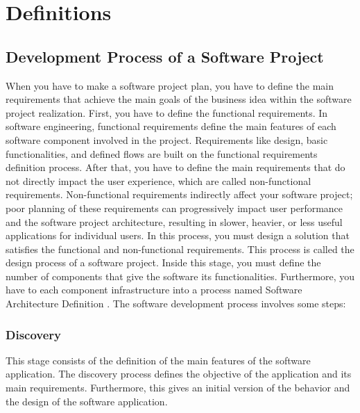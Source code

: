 
\chapter{Definitions}
\label{cha:definitions}

\section{Development Process of a Software Project}
When you have to make a software project plan, you have to define the main requirements that achieve the main goals of the business idea within the software project realization. First, you have to define the functional requirements. In software engineering, functional requirements define the main features of each software component involved in the project. Requirements like design, basic functionalities, and defined flows are built on the functional requirements definition process.
After that, you have to define the main requirements that do not directly impact the user experience, which are called non-functional requirements. Non-functional requirements indirectly affect your software project; poor planning of these requirements can progressively impact user performance and the software project architecture, resulting in slower, heavier, or less useful applications for individual users. In this process, you must design a solution that satisfies the functional and non-functional requirements. This process is called the design process of a software project. Inside this stage, you must define the number of components that give the software its functionalities. Furthermore, you have to each component infrastructure into a process named Software Architecture Definition \citet{software-engineering-book}.  The software development process involves some steps: 

\subsection{Discovery}
This stage consists of the definition of the main features of the software application. The discovery process defines the objective of the application and its main requirements. Furthermore, this gives an initial version of the behavior and the design of the software application.

